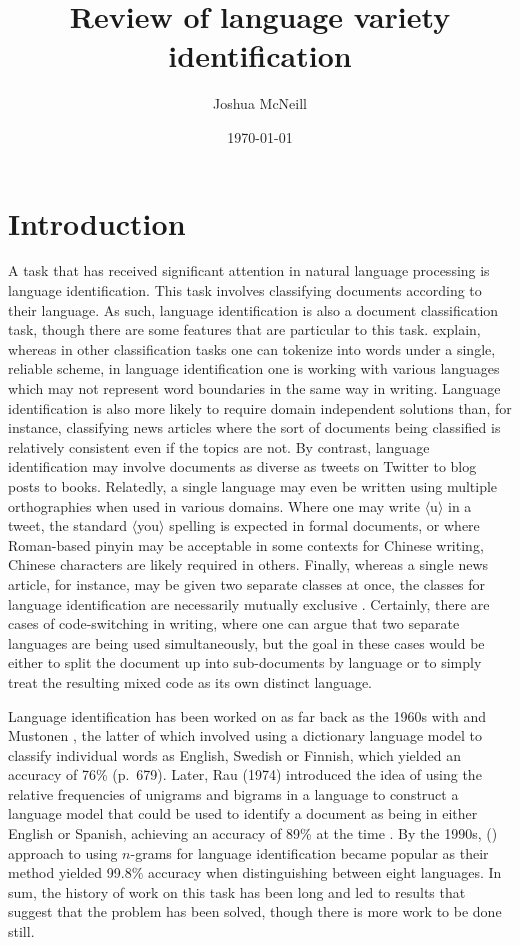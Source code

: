 \documentclass{article}
\title{Review of language variety identification}
\author{Joshua McNeill}
\date{\today}
\newcommand{\orth}[1]{$\langle$#1$\rangle$}
\begin{document}
  \maketitle
  \section{Introduction}
    A task that has received significant attention in natural language processing is language identification.
    This task involves classifying documents according to their language.
    As such, language identification is also a document classification task, though there are some features that are particular to this task.
    \textcite{jauhiainen_automatic_2019} explain, whereas in other classification tasks one can tokenize into words under a single, reliable scheme, in language identification one is working with various languages which may not represent word boundaries in the same way in writing.
    Language identification is also more likely to require domain independent solutions than, for instance, classifying news articles where the sort of documents being classified is relatively consistent even if the topics are not.
    By contrast, language identification may involve documents as diverse as tweets on Twitter to blog posts to books.
    Relatedly, a single language may even be written using multiple orthographies when used in various domains.
    Where one may write \orth{u} in a tweet, the standard \orth{you} spelling is expected in formal documents, or where Roman-based pinyin may be acceptable in some contexts for Chinese writing, Chinese characters are likely required in others.
    Finally, whereas a single news article, for instance, may be given two separate classes at once, the classes for language identification are necessarily mutually exclusive \parencite[p.~678]{jauhiainen_automatic_2019}.
    Certainly, there are cases of code-switching in writing, where one can argue that two separate languages are being used simultaneously, but the goal in these cases would be either to split the document up into sub-documents by language or to simply treat the resulting mixed code as its own distinct language.

    Language identification has been worked on as far back as the 1960s with \textcite{gold_language_1967} and Mustonen \parencite[1965, as cited in][]{jauhiainen_automatic_2019}, the latter of which involved using a dictionary language model to classify individual words as English, Swedish or Finnish, which yielded an accuracy of 76\% (p.~679).
    Later, Rau (1974) introduced the idea of using the relative frequencies of unigrams and bigrams in a language to construct a language model that could be used to identify a document as being in either English or Spanish, achieving an accuracy of 89\% at the time \parencite[as cited in][p.~680]{jauhiainen_automatic_2019}.
    By the 1990s, \citeauthor{cavnar_n-gram-based_1994} (\citeyear{cavnar_n-gram-based_1994}) approach to using $n$-grams for language identification became popular as their method yielded 99.8\% accuracy when distinguishing between eight languages.
    In sum, the history of work on this task has been long and led to results that suggest that the problem has been solved, though there is more work to be done still.
\end{document}
